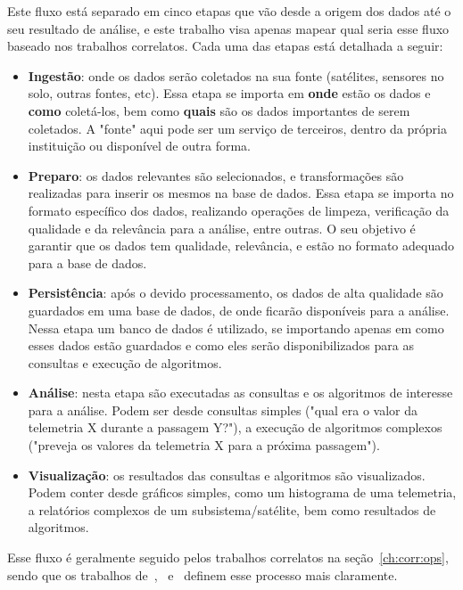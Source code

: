 Este fluxo está separado em cinco etapas que vão desde a origem dos dados até o seu resultado de análise, e este trabalho visa apenas mapear qual seria esse fluxo baseado nos trabalhos correlatos.
Cada uma das etapas está detalhada a seguir:

\begin{itemize}
	\item \textbf{Ingestão}: onde os dados serão coletados na sua fonte (satélites, sensores no solo, outras fontes, etc).
Essa etapa se importa em \textbf{onde} estão os dados e \textbf{como} coletá-los, bem como \textbf{quais} são os dados importantes de serem coletados.
A "fonte" aqui pode ser um serviço de terceiros, dentro da própria instituição ou disponível de outra forma.
	\item \textbf{Preparo}: os dados relevantes são selecionados, e transformações são realizadas para inserir os mesmos na base de dados.
Essa etapa se importa no formato específico dos dados, realizando operações de limpeza, verificação da qualidade e da relevância para a análise, entre outras.
O seu objetivo é garantir que os dados tem qualidade, relevância, e estão no formato adequado para a base de dados.
	\item \textbf{Persistência}: após o devido processamento, os dados de alta qualidade são guardados em uma base de dados, de onde ficarão disponíveis para a análise.
Nessa etapa um banco de dados é utilizado, se importando apenas em como esses dados estão guardados e como eles serão disponibilizados para as consultas e execução de algoritmos.
	\item \textbf{Análise}: nesta etapa são executadas as consultas e os algoritmos de interesse para a análise.
Podem ser desde consultas simples ("qual era o valor da telemetria X durante a passagem Y?"), a execução de algoritmos complexos ("preveja os valores da telemetria X para a próxima passagem").
	\item \textbf{Visualização}: os resultados das consultas e algoritmos são visualizados.
Podem conter desde gráficos simples, como um histograma de uma telemetria, a relatórios complexos de um subsistema/satélite, bem como resultados de algoritmos.
\end{itemize}

Esse fluxo é geralmente seguido pelos trabalhos correlatos na seção~\ref{ch:corr:ops}, sendo que os trabalhos de~\cite{zhangBigDataFramework2017},~\cite{mateikUsingBigData2017} e~\cite{boussoufBigDataBased2018} definem esse processo mais claramente.

